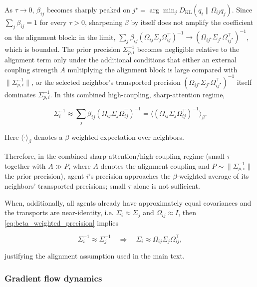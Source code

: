 \documentclass[11pt]{article}
\begin{document}
As $\tau \to 0$, $\beta_{ij}$ becomes sharply peaked on $j^\star = \arg\min_j D_{\mathrm{KL}}(q_i \| \Omega_{ij}q_j)$. Since $\sum_j \beta_{ij} = 1$ for every $\tau > 0$, sharpening $\beta$ by itself does not amplify the coefficient on the alignment block: in the limit, $\sum_j \beta_{ij}(\Omega_{ij}\Sigma_j\Omega_{ij}^\top)^{-1} \to (\Omega_{ij^\star}\Sigma_{j^\star}\Omega_{ij^\star}^\top)^{-1}$, which is bounded. The prior precision $\Sigma_{p,i}^{-1}$ becomes negligible relative to the alignment term only under the additional conditions that either an external coupling strength $A$ multiplying the alignment block is large compared with $\|\Sigma_{p,i}^{-1}\|$, or the selected neighbor's transported precision $(\Omega_{ij^\star}\Sigma_{j^\star}\Omega_{ij^\star}^\top)^{-1}$ itself dominates $\Sigma_{p,i}^{-1}$. In this combined high-coupling, sharp-attention regime,

\begin{equation}
\boxed{
\Sigma_i^{-1}
\approx
\sum_j \beta_{ij}
(\Omega_{ij}\Sigma_j\Omega_{ij}^\top)^{-1}
=\big\langle(\Omega_{ij}\Sigma_j\Omega_{ij}^\top)^{-1}
\big\rangle_{\beta}.}
\label{eq:beta_weighted_precision}
\end{equation}

Here $\langle \cdot \rangle_{\beta}$ denotes a $\beta$-weighted expectation over neighbors.

Therefore, in the combined sharp-attention/high-coupling regime (small $\tau$ together with $A \gg P$, where $A$ denotes the alignment coupling and $P \sim \|\Sigma_{p,i}^{-1}\|$ the prior precision), agent $i$'s precision approaches the $\beta$-weighted average of its neighbors' transported precisions; small $\tau$ alone is not sufficient.

When, additionally, all agents already have approximately equal covariances and the transports are near-identity, i.e. $\Sigma_i \approx \Sigma_j$ and $\Omega_{ij} \approx I$, then \eqref{eq:beta_weighted_precision} implies

\begin{equation}
\Sigma_i^{-1} \approx \Sigma_j^{-1}
\quad\Longrightarrow\quad
\Sigma_i \approx \Omega_{ij}\Sigma_j\Omega_{ij}^\top,
\end{equation}

justifying the alignment assumption used in the main text.

\subsubsection{Gradient flow dynamics}
\end{document}
